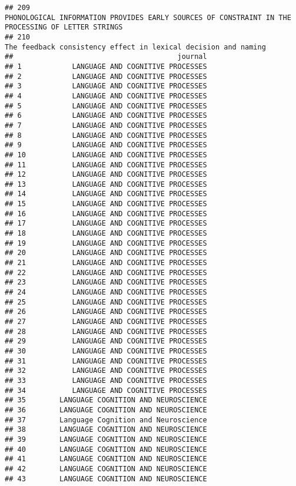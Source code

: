 \documentclass[
  english,
  man]{apa6}
\begin{document}
\begin{verbatim}
## 209                                                                                                                                        PHONOLOGICAL INFORMATION PROVIDES EARLY SOURCES OF CONSTRAINT IN THE PROCESSING OF LETTER STRINGS
## 210                                                                                                                                                                           The feedback consistency effect in lexical decision and naming
##                                       journal
## 1            LANGUAGE AND COGNITIVE PROCESSES
## 2            LANGUAGE AND COGNITIVE PROCESSES
## 3            LANGUAGE AND COGNITIVE PROCESSES
## 4            LANGUAGE AND COGNITIVE PROCESSES
## 5            LANGUAGE AND COGNITIVE PROCESSES
## 6            LANGUAGE AND COGNITIVE PROCESSES
## 7            LANGUAGE AND COGNITIVE PROCESSES
## 8            LANGUAGE AND COGNITIVE PROCESSES
## 9            LANGUAGE AND COGNITIVE PROCESSES
## 10           LANGUAGE AND COGNITIVE PROCESSES
## 11           LANGUAGE AND COGNITIVE PROCESSES
## 12           LANGUAGE AND COGNITIVE PROCESSES
## 13           LANGUAGE AND COGNITIVE PROCESSES
## 14           LANGUAGE AND COGNITIVE PROCESSES
## 15           LANGUAGE AND COGNITIVE PROCESSES
## 16           LANGUAGE AND COGNITIVE PROCESSES
## 17           LANGUAGE AND COGNITIVE PROCESSES
## 18           LANGUAGE AND COGNITIVE PROCESSES
## 19           LANGUAGE AND COGNITIVE PROCESSES
## 20           LANGUAGE AND COGNITIVE PROCESSES
## 21           LANGUAGE AND COGNITIVE PROCESSES
## 22           LANGUAGE AND COGNITIVE PROCESSES
## 23           LANGUAGE AND COGNITIVE PROCESSES
## 24           LANGUAGE AND COGNITIVE PROCESSES
## 25           LANGUAGE AND COGNITIVE PROCESSES
## 26           LANGUAGE AND COGNITIVE PROCESSES
## 27           LANGUAGE AND COGNITIVE PROCESSES
## 28           LANGUAGE AND COGNITIVE PROCESSES
## 29           LANGUAGE AND COGNITIVE PROCESSES
## 30           LANGUAGE AND COGNITIVE PROCESSES
## 31           LANGUAGE AND COGNITIVE PROCESSES
## 32           LANGUAGE AND COGNITIVE PROCESSES
## 33           LANGUAGE AND COGNITIVE PROCESSES
## 34           LANGUAGE AND COGNITIVE PROCESSES
## 35        LANGUAGE COGNITION AND NEUROSCIENCE
## 36        LANGUAGE COGNITION AND NEUROSCIENCE
## 37        Language Cognition and Neuroscience
## 38        LANGUAGE COGNITION AND NEUROSCIENCE
## 39        LANGUAGE COGNITION AND NEUROSCIENCE
## 40        LANGUAGE COGNITION AND NEUROSCIENCE
## 41        LANGUAGE COGNITION AND NEUROSCIENCE
## 42        LANGUAGE COGNITION AND NEUROSCIENCE
## 43        LANGUAGE COGNITION AND NEUROSCIENCE

\end{verbatim}
\end{document}
